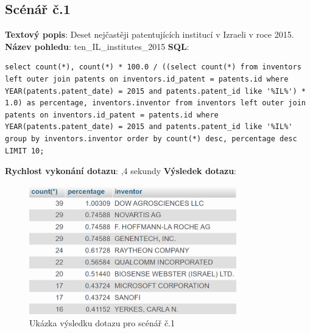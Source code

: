\subsection{Scénář č.1}
\textbf{Textový popis}: Deset nejčastěji patentujících institucí v Izraeli v roce 2015.
\newline
\textbf{Název pohledu}: ten\_IL\_institutes\_2015
\newline
\textbf{SQL}: 
\begin{lstlisting}[label = {lst:elements_a}]
select count(*), count(*) * 100.0 / ((select count(*) from inventors left outer join patents on inventors.id_patent = patents.id where YEAR(patents.patent_date) = 2015 and patents.patent_id like '%IL%') * 1.0) as percentage, inventors.inventor from inventors left outer join patents on inventors.id_patent = patents.id where YEAR(patents.patent_date) = 2015 and patents.patent_id like '%IL%' group by inventors.inventor order by count(*) desc, percentage desc LIMIT 10;
\end{lstlisting}
\textbf{Rychlost vykonání dotazu}:  ,4 sekundy
\newline
\textbf{Výsledek dotazu}:
\begin{figure}[H]
\centering
\includegraphics[width=9cm]{img/scenare/scenar_1}
\caption{Ukázka výsledku dotazu pro scénář č.1}
\label{fig:scenar1}
\end{figure}

\newpage
